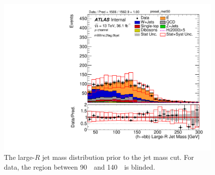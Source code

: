 \begin{figure}[!h]
\begin{center}
\includegraphics[scale=0.33]{./figures/boosted/mBBInc/Unblinded/DataMC_2tag_0bjet_Inc_muon_presel_met50_HbbMass}
\caption{The large-$R$ jet mass distribution prior to the jet mass cut. For data, the region between 90~\GeV~and 140~\GeV~is blinded.}
\label{fig:boosted_mbbinc}
\end{center}
\end{figure}

